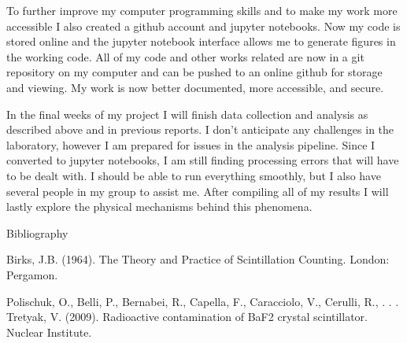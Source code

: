 \documentclass{article}
\begin{document}
To further improve my computer programming skills and to make my work more accessible I also created a github account and jupyter notebooks. Now my code is stored online and the jupyter notebook interface allows me to generate figures in the working code. All of my code and other works related are now in a git repository on my computer and can be pushed to an online github for storage and viewing. My work is now better documented, more accessible, and secure. 

In the final weeks of my project I will finish data collection and analysis as described above and in previous reports. I don't anticipate any challenges in the laboratory, however I am prepared for issues in the analysis pipeline. Since I converted to jupyter notebooks, I am still finding processing errors that will have to be dealt with. I should be able to run everything smoothly, but I also have several people in my group to assist me. After compiling all of my results I will lastly explore the physical mechanisms behind this phenomena.



\setlength{\parskip}{2em}
\noindent
Bibliography

\noindent
Birks, J.B. (1964). The Theory and Practice of Scintillation Counting. London:
Pergamon.

\noindent
Polischuk, O., Belli, P., Bernabei, R., Capella, F., Caracciolo, V., Cerulli, R., . . . Tretyak, V. (2009). Radioactive contamination of BaF2 crystal scintillator. Nuclear Institute.
\end{document}
